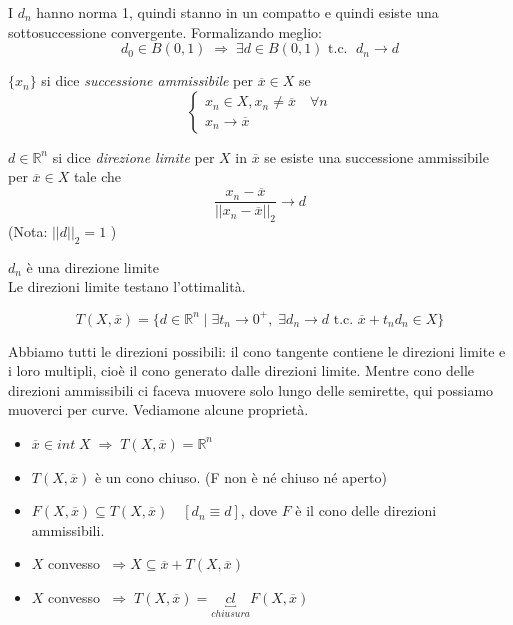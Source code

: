 \begin{observation}
I $d_n$ hanno norma 1, quindi stanno in un compatto e quindi
 esiste una sottosuccessione convergente.  Formalizando meglio:
$$ d_0 \in B(0,1) \; \Rightarrow \; \exists d \in B(0,1) \text{ t.c. }
\; d_n \to d$$
\end{observation}
\begin{defn}
$\{x_n \}$ si dice \emph{successione ammissibile} per $\overline{x} \in X$
se
$$
\left\{
\begin{array}{l}
x_n \in X, x_n \neq \overline{x} \quad \forall n \\
x_n \to \overline{x}
\end{array}
\right.
$$
\end{defn}

\begin{defn}
$d \in \mathbb{R}^{n}$ si dice \emph{direzione limite} per $X$ in
$\overline{x}$ se esiste una successione ammissibile
per $\overline{x} \in X$ tale che
$$
\dfrac{x_n - \overline{x}}{||x_n - \overline{x}||_2 }\to d
$$
(Nota: $||d||_2 = 1$ )
\end{defn}

$d_n$ \`e una direzione limite \\
Le direzioni limite testano l'ottimalit\`a. \\
\begin{defn}
$$ T(X, \overline{x}) = \{ d \in \mathbb{R}^{n} \; | \; \exists
t_n \rightarrow 0^{+}, \; \exists d_n \rightarrow d \text{ t.c. }
\overline{x} + t_nd_n \in X \}
$$
\end{defn}
Abbiamo tutti le direzioni possibili: il cono tangente contiene
le direzioni limite e i loro multipli, cio\`e il cono generato
dalle direzioni limite.
Mentre cono delle direzioni ammissibili ci faceva muovere
solo lungo delle semirette, qui possiamo muoverci per curve.
 Vediamone alcune propriet\`a.
\begin{property}
\begin{itemize}
\item $\overline{x} \in int\; X \; \Rightarrow \; T(X, \overline{x}) = \mathbb{R}^{n}$
\item $T(X, \overline{x})$ \`e un cono chiuso.
  (F non \`e n\'e chiuso n\'e aperto)
\item $F(X, \overline{x}) \subseteq T(X, \overline{x}) \quad
 [d_n \equiv d ]$, dove $F$ \`e il cono delle direzioni ammissibili.
\item $X$ convesso $ \; \Rightarrow X \subseteq \overline{x} + T(X, \overline{x})$
\item $X$ convesso
  $ \; \Rightarrow \; T(X, \overline{x}) = \underbracket{cl}_{chiusura}F(X, \overline{x})$
\end{itemize}
\end{property}

